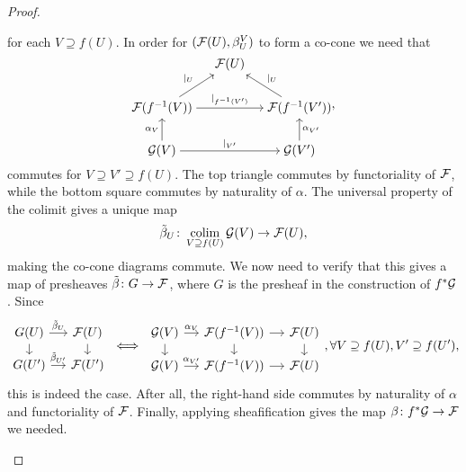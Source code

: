 \documentclass{article}
\DeclareMathOperator{\colim}{colim}
\begin{document}
\begin{proof}
\begin{itemize}
              for each $V \supseteq f(U)$. In order for $(\mathcal{F}(U), \beta_U^V)$ to
              form a co-cone we need that
              \begin{equation*}
                  \begin{tikzcd}[column sep=small, cramped]
                      &\mcF(U)\\
                      \mcF(f\inv(V)) \ar[rr, "|_{f\inv(V')}"] \ar[ru, "|_U"]
                      & & \mcF(f\inv(V')) \ar[lu, "|_U"'] \\
                      \mcG(V) \ar[rr, "|_{V'}"] \ar[u, "\alpha_V"] & &
                      \mcG(V') \ar[u, "\alpha_{V'}"']
                  \end{tikzcd}
                  ,
              \end{equation*}
              commutes for $V \supseteq V' \supseteq f(U)$.
              The top triangle commutes by functoriality of $\mathcal{F}$,
              while the bottom square commutes by naturality of $\alpha$.
              The universal property of the colimit gives a unique map
              \begin{equation*}
                  \tilde{\beta}_U \colon \colim_{V \supseteq f(U)} \mcG(V) \to \mcF(U),
              \end{equation*}
              making the co-cone diagrams commute.
              We now need to verify that this gives a map of presheaves
              $\tilde{\beta} \colon G \to \mathcal{F}$,
              where $G$ is the presheaf in the construction
              of $f^*\mathcal{G}$. Since
              \begin{equation*}
                  \begin{tikzcd}[sep=small]
                      G(U)\dar \rar["\tilde{\beta}_U"] & \mcF(U) \dar\\
                      G(U') \rar["\tilde{\beta}_{U'}"] & \mcF(U')
                  \end{tikzcd}
                  \iff
                  \begin{tikzcd}[sep=small]
                      \mcG(V) \rar["\alpha_V"] \dar
                      & \mcF(f\inv(V)) \rar \dar
                      & \mcF(U) \dar \\
                      \mcG(V) \rar["\alpha_{V'}"]
                      & \mcF(f\inv(V)) \rar
                      & \mcF(U)
                  \end{tikzcd}
                  , \forall V \supseteq f(U), V' \supseteq f(U'),
              \end{equation*}
              this is indeed the case. After all, the right-hand side
              commutes by naturality of $\alpha$ and functoriality of $\mathcal{F}$.
              Finally, applying sheafification
              gives the map $\beta \colon f^*\mathcal{G} \to \mathcal{F}$ we needed.


\end{itemize}
\end{proof}
\end{document}
